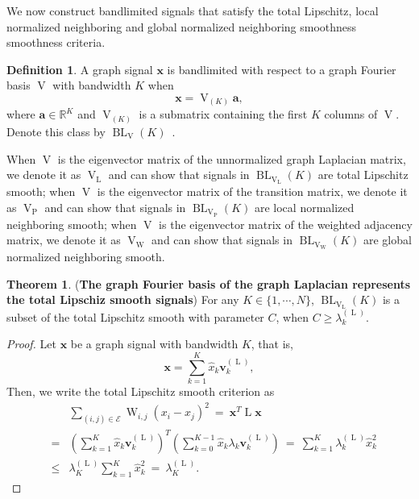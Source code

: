 \documentclass[journal,twocolumn,10pt]{IEEEtran}
\theoremstyle{definition}
\newtheorem{defn}{Definition}
\newtheorem{myThm}{Theorem}
\newcommand{\R}{\ensuremath{\mathbb{R}}}
\def\a{\mathbf{a}}
\def\x{\mathbf{x}}
\def\vv{\mathbf{v}}
\def\E{\mathcal{E}}
\DeclareMathOperator{\LL}{L}
\DeclareMathOperator{\BL}{BL}
\DeclareMathOperator{\Pj}{P}
\DeclareMathOperator{\Vm}{V}
\DeclareMathOperator{\W}{W}
\begin{document}
We now construct bandlimited signals that satisfy the total Lipschitz, local normalized neighboring and global normalized neighboring smoothness smoothness criteria.
\begin{defn}
A graph signal $\x$ is bandlimited with respect to a graph Fourier basis $\Vm$ with bandwidth $K$ when
\begin{equation*}
	\x = \Vm_{(K)} \a,
\end{equation*}
where $\a \in \R^{K}$ and $\Vm_{(K)}$ is a submatrix containing the first $K$ columns of $\Vm$. Denote this class by $\BL_{\Vm}(K)$~\cite{ChenVSK:15}.
\end{defn}
When $\Vm$ is the eigenvector matrix of the unnormalized graph Laplacian matrix, we denote it as $\Vm_{\LL}$ and can show that signals in $\BL_{\Vm_{\LL}}(K)$ are total Lipschitz smooth; when $\Vm$ is the eigenvector matrix of the transition matrix, we denote it as $\Vm_{\Pj}$ and can show that signals in $\BL_{\Vm_{\Pj}}(K)$ are local normalized neighboring smooth; when $\Vm$ is the eigenvector matrix of the weighted adjacency matrix, we denote it as $\Vm_{\W}$ and can show that signals in $\BL_{\Vm_{\W}}(K)$ are global normalized neighboring smooth.

\begin{myThm} ({\bf The graph Fourier basis of the graph Laplacian represents the total Lipschiz smooth signals})
\label{thm:BLvsGS}
For any $K \in \{1, \cdots, N \}$, $\BL_{\Vm_{\LL}}(K)$ is a subset of the total Lipschitz smooth with parameter $C$, when $C \geq \lambda^{(\LL)}_k$.
\end{myThm}
\begin{proof}
Let $\x$ be a graph signal with bandwidth $K$, that is,
$$
\x = \sum_{k=1}^{K} \widehat{x}_k \vv^{(\LL)}_k,
$$
Then, we write the total Lipschitz smooth criterion as
\begin{eqnarray*}
&& \sum_{(i,j) \in \E} \W_{i,j} ( x_i - x_j )^2 
\ = \ \x^T \LL \x 
\\
& =  &  (\sum_{k=1}^{K} \widehat{x}_k \vv^{(\LL)}_k)^T (\sum_{k=0}^{K-1} \widehat{x}_k \lambda_k \vv^{(\LL)}_k)
\ = \   \sum_{k=1}^{K} \lambda^{(\LL)}_k \widehat{x}_k^2 
\\
& \leq & \lambda^{(\LL)}_K   \sum_{k=1}^{K} \widehat{x}_k^2  
\ = \   \lambda^{(\LL)}_K.
\end{eqnarray*}
\end{proof}
\end{document}
